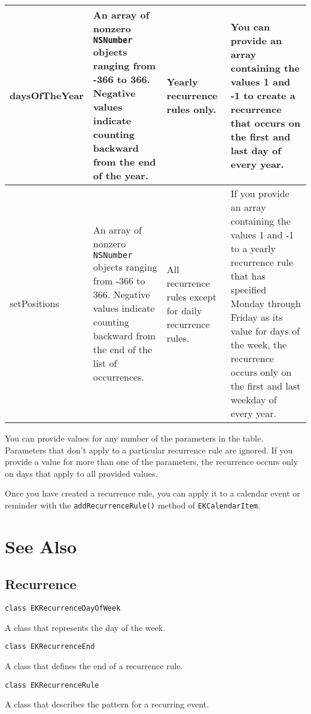 \documentclass{article}
\begin{document}
\begin{table}[!ht]
\begin{tabular}{|>{\centering}m{2cm}|>{\centering}m{3cm}|>{\centering}m{2cm}|>{\centering}m{6cm}|}
        \hline
        daysOfTheYear & An array of nonzero \texttt{NSNumber} objects ranging from -366 to 366. Negative values indicate counting backward from the end of the year. & Yearly recurrence rules only. & You can provide an array containing the values 1 and -1 to create a recurrence that occurs on the first and last day of every year. \\
        \hline
        setPositions & An array of nonzero \texttt{NSNumber} objects ranging from -366 to 366. Negative values indicate counting backward from the end of the list of occurrences. & All recurrence rules except for daily recurrence rules. & If you provide an array containing the values 1 and -1 to a yearly recurrence rule that has specified Monday through Friday as its value for days of the week, the recurrence occurs only on the first and last weekday of every year. \\
        \hline
    \end{tabular}
\end{table}

You can provide values for any number of the parameters in the table. Parameters that don't apply to a particular recurrence rule are ignored. If you provide a value for more than one of the parameters, the recurrence occurs only on days that apply to all provided values.

Once you have created a recurrence rule, you can apply it to a calendar event or reminder with the \texttt{addRecurrenceRule()} method of \texttt{EKCalendarItem}.

\section*{See Also}

\subsection*{Recurrence}

\texttt{class EKRecurrenceDayOfWeek}

A class that represents the day of the week.

\texttt{class EKRecurrenceEnd}

A class that defines the end of a recurrence rule.

\texttt{class EKRecurrenceRule}

A class that describes the pattern for a recurring event.

\newpage
\end{document}
